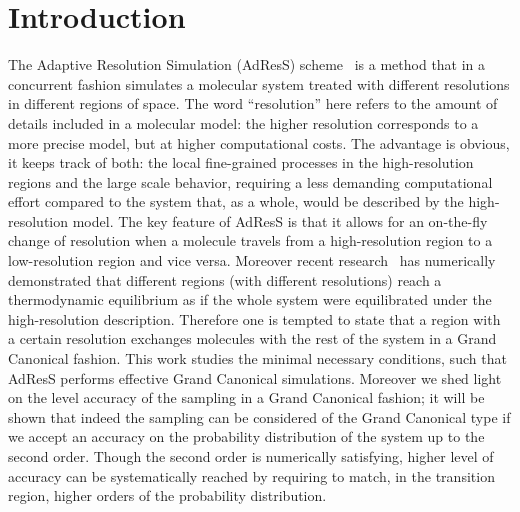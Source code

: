 \documentclass[aip,jcp,a4paper,reprint,onecolumn]{revtex4-1}
\newcommand{\redc}[1]{{\color{red} #1}}
\begin{document}
\section{Introduction}
The Adaptive Resolution Simulation (AdResS) scheme~\cite{jcp,pre} is a
method that in a concurrent fashion simulates a molecular system treated with different
resolutions in different regions of space.  The word ``resolution''
here refers to the amount of details included in a molecular model: the higher 
resolution corresponds to a more precise model, but at higher computational costs. The advantage is obvious, it
keeps track of both: the local fine-grained processes in the
high-resolution regions and the large scale behavior, requiring a less demanding computational effort compared to the system that, as a
whole, would be described by the high-resolution model. The key feature of
AdResS is that it allows \redc{for} an on-the-fly change of resolution when a
molecule travels from a high-resolution region to a low-resolution
region and vice versa. Moreover recent research~\cite{prlgc, rdfcorr}
has numerically demonstrated that different regions (with different resolutions) reach a
thermodynamic equilibrium as if the whole system \redc{were} equilibrated
under the high-resolution description. Therefore one is tempted to state that a region with a
certain resolution exchanges molecules with the rest of the system in
a Grand Canonical fashion. \redc{This work
studies} the minimal necessary conditions, such that AdResS
performs effective Grand Canonical simulations.  
Moreover we shed light on the level accuracy of
the sampling in a Grand Canonical fashion; it will be shown that indeed the sampling can be considered 
of the Grand Canonical type if we accept an accuracy on the probability distribution of the system up to the second order.
Though the second order is numerically satisfying, higher level of accuracy can be systematically reached by requiring to match, in the transition region, higher orders of the probability distribution.
\end{document}
